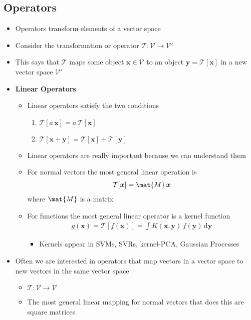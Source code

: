 \documentclass[11pt]{article}
\newcommand{\dd}{\mathrm{d}}
\begin{document}
\subsection{Operators}
\label{sec:orgccfa305}
\begin{itemize}
\item Operators transform elements of a vector space
\item Consider the transformation or operator \(\mathcal{T}: \mathcal{V} \rightarrow \mathcal{V}'\)
\item This says that \(\mathcal{T}\) maps some object
\(\bm{x}\in\mathcal{V}\) to an object \(\bm{y}=\mathcal{T}[\bm{x}]\)
in a new vector space \(\mathcal{V}'\)
\item \textbf{Linear Operators}
\begin{itemize}
\item Linear operators satisfy the two conditions
\begin{enumerate}
\item \(\mathcal{T}[a\,\bm{x}] = a\,\mathcal{T}[\bm{x}]\)
\item \(\mathcal{T}[\bm{x} + \bm{y}] = \mathcal{T}[\bm{x}] + \mathcal{T}[\bm{y}]\)
\end{enumerate}
\item Linear operators are really important because we can understand them
\item For normal vectors the most general linear operation is
\begin{align*}
  \mathcal{T}[\bm{x}] = \mat{M}\,\bm{x}
\end{align*}
where \(\mat{M}\) is a matrix
\item For functions the most general linear operator is a kernel function
\begin{align*}
   g(\bm{x}) = \mathcal{T}[f(\bm{x})] = \int
   K(\bm{x},\bm{y})\, f(\bm{y}) \, \dd \bm{y}
\end{align*}
\begin{itemize}
\item Kernels appear in SVMs, SVRs, kernel-PCA, Gaussian Processes
\end{itemize}
\end{itemize}
\item Often we are interested in operators that map vectors in a vector space to new
vectors in the same vector space
\begin{itemize}
\item \(\mathcal{T}: \mathcal{V}\rightarrow\mathcal{V}\)
\item The most general linear mapping for normal vectors that does this are square matrices
\end{itemize}
\end{itemize}
\end{document}
